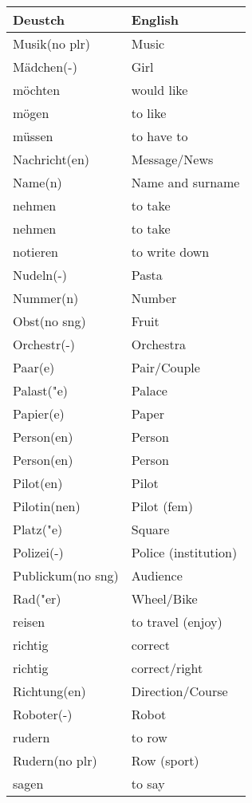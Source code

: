 \documentclass{article}
\renewcommand{\arraystretch}{1}
\begin{document}
\hfill
\begin{minipage}{0.48\textwidth}
    \centering
    \renewcommand{\arraystretch}{1.5}
    \begin{tabular}{|>{\raggedright\arraybackslash}p{3.5cm}|>{\raggedright\arraybackslash}p{3.5cm}|}
        \hline
        \rowcolor{gray!20} \textbf{Deustch} & \textbf{English} \\
        \hline
        Musik(no plr) & Music \\\hline
        Mädchen(-) & Girl \\\hline
        möchten & would like \\\hline
        mögen & to like \\\hline
        müssen & to have to \\\hline
        Nachricht(en) & Message/News \\\hline
        Name(n) & Name and surname \\\hline
        nehmen &  to take \\\hline
        nehmen & to take \\\hline
        notieren & to write down \\\hline
        Nudeln(-) & Pasta \\\hline
        Nummer(n) & Number \\\hline
        Obst(no sng) & Fruit \\\hline
        Orchestr(-) & Orchestra \\\hline
        Paar(e) & Pair/Couple \\\hline
        Palast("e) & Palace \\\hline
        Papier(e) & Paper \\\hline
        Person(en) & Person \\\hline
        Person(en) & Person \\\hline
        Pilot(en) & Pilot \\\hline
        Pilotin(nen) & Pilot (fem) \\\hline
        Platz("e) & Square \\\hline
        Polizei(-) & Police (institution) \\\hline
        Publickum(no sng) & Audience \\\hline
        Rad("er) & Wheel/Bike \\\hline
        reisen & to travel (enjoy) \\\hline
        richtig & correct \\\hline
        richtig & correct/right \\\hline
        Richtung(en) & Direction/Course \\\hline
        Roboter(-) & Robot \\\hline
        rudern & to row \\\hline
        Rudern(no plr) & Row (sport) \\\hline
        sagen & to say \\\hline
    \end{tabular}
\end{minipage}
\end{document}
